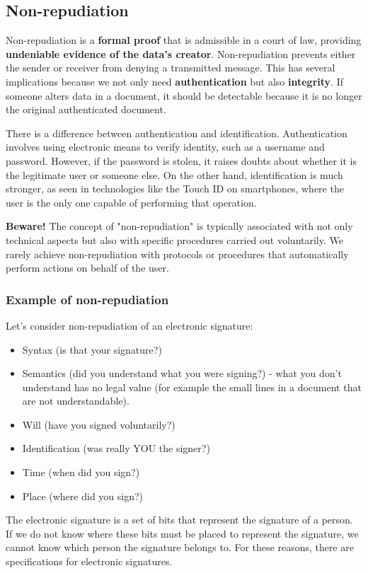 \subsection{Non-repudiation}
Non-repudiation is a \textbf{formal proof} that is admissible in a court of law, providing \textbf{undeniable evidence of the data's creator}. Non-repudiation prevents either the sender or receiver from denying a transmitted message. This has several implications because we not only need \textbf{authentication} but also \textbf{integrity}. If someone alters data in a document, it should be detectable because it is no longer the original authenticated document.

There is a difference between authentication and identification. Authentication involves using electronic means to verify identity, such as a username and password. However, if the password is stolen, it raises doubts about whether it is the legitimate user or someone else. On the other hand, identification is much stronger, as seen in technologies like the Touch ID on smartphones, where the user is the only one capable of performing that operation.

\textbf{Beware!} The concept of "non-repudiation" is typically associated with not only technical aspects but also with specific procedures carried out voluntarily. We rarely achieve non-repudiation with protocols or procedures that automatically perform actions on behalf of the user.

\subsubsection{Example of non-repudiation}
Let's consider non-repudiation of an electronic signature:
\begin{itemize}
	\item Syntax (is that your signature?)
	\item Semantics (did you understand what you were signing?) - what you don't understand has no legal value (for example the small lines in a document that are not understandable).
	\item Will (have you signed voluntarily?)
	\item Identification (was really YOU the signer?)
	\item Time (when did you sign?)
	\item Place (where did you sign?)
\end{itemize}
The electronic signature is a set of bits that represent the signature of a person. If we do not know where these bits must be placed to represent the signature, we cannot know which person the signature belongs to. For these reasons, there are specifications for electronic signatures.


